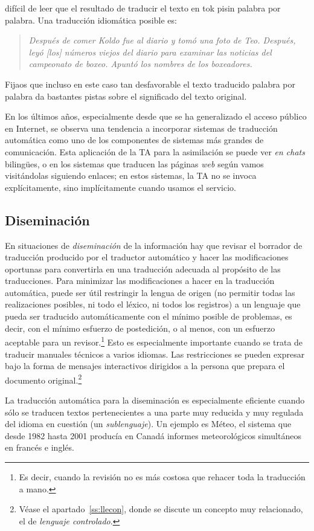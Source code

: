 difícil de leer que el resultado de traducir el texto en tok pisin palabra por palabra. Una traducción idiomática posible es: \begin{quote}{\sl Después de comer Koldo fue al diario y tomó una foto de Teo. Después, leyó [los] números viejos del diario para examinar las noticias del campeonato de boxeo. Apuntó los nombres de los boxeadores.} \end{quote} Fijaos que incluso en este caso tan desfavorable el texto traducido palabra por palabra da bastantes pistas sobre el significado del texto original. 

En los últimos años, especialmente desde que se ha generalizado el acceso público en Internet, se observa una tendencia a incorporar sistemas de traducción automática como uno de los componentes de sistemas más grandes de comunicación. Esta aplicación de la TA para la asimilación se puede ver \emph{en chats} bilingües, o en los sistemas que traducen las páginas \emph{web} según vamos visitándolas siguiendo enlaces; en estos sistemas, la TA no se invoca explícitamente, sino implícitamente cuando usamos el servicio. 

\subsection{Diseminación} En situaciones de \emph{diseminación} de la información hay que revisar el borrador de traducción producido por el traductor automático y hacer las modificaciones oportunas para convertirla en una traducción adecuada al propósito de las traducciones. Para minimizar las modificaciones a hacer en la traducción automática, puede ser útil restringir la lengua de origen (no permitir todas las realizaciones posibles, ni todo el léxico, ni todos los registros) a un lenguaje que pueda ser traducido automáticamente con el mínimo posible de problemas, es decir, con el mínimo esfuerzo de postedición, o al menos, con un esfuerzo aceptable para un revisor.\footnote{Es decir, cuando la revisión no es más costosa que rehacer toda la traducción a mano.} Esto es especialmente importante cuando se trata de traducir manuales técnicos a varios idiomas. Las restricciones se pueden expresar bajo la forma de mensajes interactivos dirigidos a la persona que prepara el documento original.\footnote{Véase el apartado~\ref{ss:llecon}, donde se discute un concepto muy relacionado, el de \emph{lenguaje controlado}.} 

La traducción automática para la diseminación es especialmente eficiente cuando sólo se traducen textos pertenecientes a una parte muy reducida y muy regulada del idioma en cuestión (un \emph{sublenguaje}). Un ejemplo es Méteo, el sistema que desde 1982 hasta 2001 producía en Canadá informes meteorológicos simultáneos en francés e inglés. 

